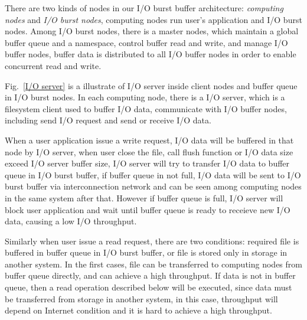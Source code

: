 There are two kinds of nodes in our I/O burst buffer architecture: \emph{computing nodes} and \emph{I/O burst nodes}, computing nodes run user's application and I/O burst nodes.
Among I/O burst nodes, there is a master nodes, which maintain a global buffer queue and a namespace, control buffer read and write, and manage I/O buffer nodes, buffer data is distributed to all I/O buffer nodes in order to enable concurrent read and write.

Fig.~\ref{I/O server} is a illustrate of I/O server inside client nodes and buffer queue in I/O burst nodes.
In each computing node, there is a I/O server, which is a filesystem client used to buffer I/O data, communicate with I/O buffer nodes, including send I/O request and send or receive I/O data.

When a user application issue a write request, I/O data will be buffered in that node by I/O server, when user close the file, call flush function or I/O data size exceed I/O server buffer size, I/O server will try to transfer I/O data to buffer queue in I/O burst buffer, if buffer queue in not full, I/O data will be sent to I/O burst buffer via interconnection network and can be seen among computing nodes in the same system after that.
However if buffer queue is full, I/O server will block user application and wait until buffer queue is ready to receieve new I/O data, causing a low I/O throughput.


Similarly when user issue a read request, there are two conditions: required file is buffered in buffer queue in I/O burst buffer, or file is stored only in storage in another system.
In the first cases, file can be transferred to computing nodes from buffer queue directly, and can achieve a high throughput.
If data is not in buffer queue, then a read operation described below will be executed, since data must be transferred from storage in another system, in this case, throughput will depend on Internet condition and it is hard to achieve a high throughput.

